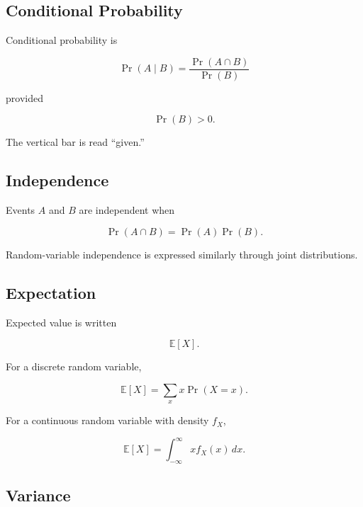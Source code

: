 \subsection{Conditional Probability}
\label{subsec:conditional-probability-reference}

Conditional probability is

\[
\boxed{
\Pr(A\mid B)
=
\frac{
\Pr(A\cap B)
}{
\Pr(B)
}
}
\]

provided

\[
\Pr(B)>0.
\]

The vertical bar is read ``given.''

\subsection{Independence}
\label{subsec:independence-notation-reference}

Events \(A\) and \(B\) are independent when

\[
\boxed{
\Pr(A\cap B)
=
\Pr(A)\Pr(B).
}
\]

Random-variable independence is expressed similarly through joint
distributions.

\subsection{Expectation}
\label{subsec:expectation-notation-reference}

Expected value is written

\[
\boxed{
\mathbb{E}[X].
}
\]

For a discrete random variable,

\[
\boxed{
\mathbb{E}[X]
=
\sum_x
x\Pr(X=x).
}
\]

For a continuous random variable with density \(f_X\),

\[
\boxed{
\mathbb{E}[X]
=
\int_{-\infty}^{\infty}
x f_X(x)\,dx.
}
\]

\subsection{Variance}
\label{subsec:variance-notation-reference}

